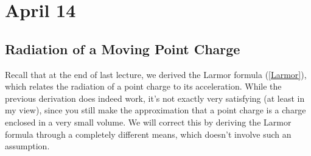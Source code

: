 \section{April 14}
\subsection{Radiation of a Moving Point Charge}
Recall that at the end of last lecture, we derived the Larmor formula (\cref{Larmor}), which relates the
radiation of a point charge to its acceleration. While the previous derivation does indeed work, it's not
exactly very satisfying (at least in my view), since you still make the approximation that a point charge is
a charge enclosed in a very small volume. We will correct this by deriving the Larmor formula through a
completely different means, which doesn't involve such an assumption.  


